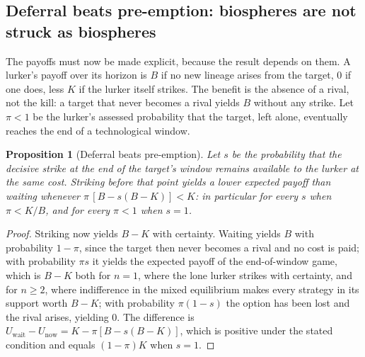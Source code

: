 \documentclass[preprint,12pt]{elsarticle}
\newtheorem{proposition}{Proposition}
\theoremstyle{definition}
\begin{document}
\subsection{Deferral beats pre-emption: biospheres are not struck as biospheres}
\label{sec:biosphere}

The payoffs must now be made explicit, because the result depends on them. A lurker's payoff over its horizon is $B$ if no new lineage arises from the target, $0$ if one does, less $K$ if the lurker itself strikes. The benefit is the absence of a rival, not the kill: a target that never becomes a rival yields $B$ without any strike. Let $\pi < 1$ be the lurker's assessed probability that the target, left alone, eventually reaches the end of a technological window.

\begin{proposition}[Deferral beats pre-emption]
\label{prop:biosphere}
Let $s$ be the probability that the decisive strike at the end of the target's window remains available to the lurker at the same cost. Striking before that point yields a lower expected payoff than waiting whenever $\pi\,[B - s(B-K)] < K$: in particular for every $s$ when $\pi < K/B$, and for every $\pi < 1$ when $s = 1$.
\end{proposition}

\begin{proof}
Striking now yields $B - K$ with certainty. Waiting yields $B$ with probability $1 - \pi$, since the target then never becomes a rival and no cost is paid; with probability $\pi s$ it yields the expected payoff of the end-of-window game, which is $B - K$ both for $n = 1$, where the lone lurker strikes with certainty, and for $n \geq 2$, where indifference in the mixed equilibrium makes every strategy in its support worth $B - K$; with probability $\pi(1-s)$ the option has been lost and the rival arises, yielding $0$. The difference is $U_{\mathrm{wait}} - U_{\mathrm{now}} = K - \pi[B - s(B-K)]$, which is positive under the stated condition and equals $(1-\pi)K$ when $s = 1$.
\end{proof}
\end{document}
